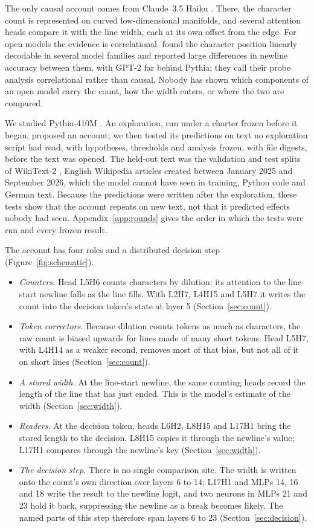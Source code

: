 \documentclass[11pt,a4paper]{article}
\begin{document}
The only causal account comes from Claude~3.5 Haiku \citep{gurnee2026manifolds}. There, the character count is represented on curved low-dimensional manifolds, and several attention heads compare it with the line width, each at its own offset from the edge. For open models the evidence is correlational. \citet{sinii2026counting} found the character position linearly decodable in several model families and reported large differences in newline accuracy between them, with GPT-2 far behind Pythia; they call their probe analysis correlational rather than causal. Nobody has shown which components of an open model carry the count, how the width enters, or where the two are compared.

We studied Pythia-410M \citep{biderman2023pythia}. An exploration, run under a charter frozen before it began, proposed an account; we then tested its predictions on text no exploration script had read, with hypotheses, thresholds and analysis frozen, with file digests, before the text was opened. The held-out text was the validation and test splits of WikiText-2 \citep{merity2017pointer}, English Wikipedia articles created between January 2025 and September 2026, which the model cannot have seen in training, Python code and German text. Because the predictions were written after the exploration, these tests show that the account repeats on new text, not that it predicted effects nobody had seen. Appendix~\ref{app:rounds} gives the order in which the tests were run and every frozen result.

The account has four roles and a distributed decision step (Figure~\ref{fig:schematic}).
\begin{itemize}
\item \emph{Counters.} Head L5H6 counts characters by dilution: its attention to the line-start newline falls as the line fills. With L2H7, L4H15 and L5H7 it writes the count into the decision token's state at layer 5 (Section~\ref{sec:count}).
\item \emph{Token correctors.} Because dilution counts tokens as much as characters, the raw count is biased upwards for lines made of many short tokens. Head L5H7, with L4H14 as a weaker second, removes most of that bias, but not all of it on short lines (Section~\ref{sec:count}).
\item \emph{A stored width.} At the line-start newline, the same counting heads record the length of the line that has just ended. This is the model's estimate of the width (Section~\ref{sec:width}).
\item \emph{Readers.} At the decision token, heads L6H2, L8H15 and L17H1 bring the stored length to the decision. L8H15 copies it through the newline's value; L17H1 compares through the newline's key (Section~\ref{sec:width}).
\item \emph{The decision step.} There is no single comparison site. The width is written onto the count's own direction over layers 6 to 14; L17H1 and MLPs 14, 16 and 18 write the result to the newline logit, and two neurons in MLPs 21 and 23 hold it back, suppressing the newline as a break becomes likely. The named parts of this step therefore span layers 6 to 23 (Section~\ref{sec:decision}).
\end{itemize}
\end{document}
